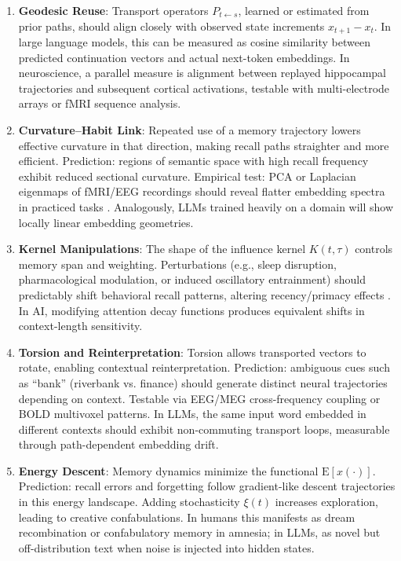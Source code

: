 \documentclass[a4paper,12pt]{article}
\newcommand{\E}{\mathrm{E}}
\begin{document}
\begin{enumerate}
    \item \textbf{Geodesic Reuse}: 
    Transport operators $P_{t \leftarrow s}$, learned or estimated from prior paths,
    should align closely with observed state increments $x_{t+1}-x_t$.
    In large language models, this can be measured as cosine similarity between
    predicted continuation vectors and actual next-token embeddings. 
    In neuroscience, a parallel measure is alignment between replayed hippocampal
    trajectories and subsequent cortical activations, testable with multi-electrode arrays
    or fMRI sequence analysis.

    \item \textbf{Curvature--Habit Link}: 
    Repeated use of a memory trajectory lowers effective curvature in that direction,
    making recall paths straighter and more efficient.
    Prediction: regions of semantic space with high recall frequency exhibit reduced
    sectional curvature. Empirical test: PCA or Laplacian eigenmaps of fMRI/EEG
    recordings should reveal flatter embedding spectra in practiced tasks 
    \citep{hassabis2007patients}. Analogously, LLMs trained heavily on a domain
    will show locally linear embedding geometries.

    \item \textbf{Kernel Manipulations}: 
    The shape of the influence kernel $K(t,\tau)$ controls memory span and weighting. 
    Perturbations (e.g., sleep disruption, pharmacological modulation, or induced oscillatory
    entrainment) should predictably shift behavioral recall patterns, altering recency/primacy
    effects \citep{stickgold2005sleep}. In AI, modifying attention decay functions 
    produces equivalent shifts in context-length sensitivity.

    \item \textbf{Torsion and Reinterpretation}: 
    Torsion allows transported vectors to rotate, enabling contextual reinterpretation.
    Prediction: ambiguous cues such as ``bank'' (riverbank vs. finance) should generate
    distinct neural trajectories depending on context. Testable via EEG/MEG 
    cross-frequency coupling or BOLD multivoxel patterns. 
    In LLMs, the same input word embedded in different contexts should exhibit
    non-commuting transport loops, measurable through path-dependent embedding drift.

    \item \textbf{Energy Descent}: 
    Memory dynamics minimize the functional $\E[x(\cdot)]$. 
    Prediction: recall errors and forgetting follow gradient-like descent trajectories
    in this energy landscape. Adding stochasticity $\xi(t)$ increases exploration,
    leading to creative confabulations. In humans this manifests as dream recombination
    or confabulatory memory in amnesia; in LLMs, as novel but off-distribution text
    when noise is injected into hidden states.


\end{enumerate}
\end{document}
